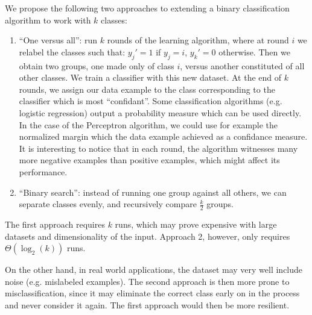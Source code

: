 We propose the following two approaches to extending a binary classification algorithm to work with $k$ classes:

\begin{enumerate}
  \item ``One versus all'': run $k$ rounds of the learning algorithm, where at round $i$ we relabel the classes such that: $y_j\prime = 1$ if $y_j = i$, $y_k\prime = 0$ otherwise. Then we obtain two groups, one made only of class $i$, versus another constituted of all other classes. We train a classifier with this new dataset. At the end of $k$ rounds, we assign our data example to the class corresponding to the classifier which is most ``confidant''. Some classification algorithms (e.g. logistic regression) output a probability measure which can be used directly. In the case of the Perceptron algorithm, we could use for example the normalized margin which the data example achieved as a confidance measure.\\
  It is interesting to notice that in each round, the algorithm witnesses many more negative examples than positive examples, which might affect its performance.

  \item ``Binary search'': instead of running one group against all others, we can separate classes evenly, and recursively compare $\frac{k}{2}$ groups.
\end{enumerate}

The first approach requires $k$ runs, which may prove expensive with large datasets and dimensionality of the input. Approach 2, however, only requires $\Theta(\log_2(k))$ runs.

On the other hand, in real world applications, the dataset may very well include noise (e.g. mislabeled examples). The second approach is then more prone to misclassification, since it may eliminate the correct class early on in the process and never consider it again. The first approach would then be more resilient.
